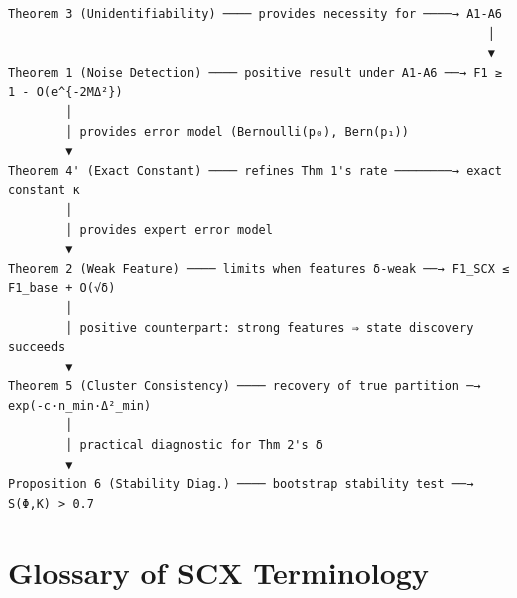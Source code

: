 \documentclass{article}
\begin{document}
\begin{verbatim}
Theorem 3 (Unidentifiability) ──── provides necessity for ────→ A1-A6
                                                                   │
                                                                   ▼
Theorem 1 (Noise Detection) ──── positive result under A1-A6 ──→ F1 ≥ 1 - O(e^{-2MΔ²})
        │
        │ provides error model (Bernoulli(p₀), Bern(p₁))
        ▼
Theorem 4' (Exact Constant) ──── refines Thm 1's rate ────────→ exact constant κ
        │
        │ provides expert error model
        ▼
Theorem 2 (Weak Feature) ──── limits when features δ-weak ──→ F1_SCX ≤ F1_base + O(√δ)
        │
        │ positive counterpart: strong features ⇒ state discovery succeeds
        ▼
Theorem 5 (Cluster Consistency) ──── recovery of true partition ─→ exp(-c·n_min·Δ²_min)
        │
        │ practical diagnostic for Thm 2's δ
        ▼
Proposition 6 (Stability Diag.) ──── bootstrap stability test ──→ S(Φ,K) > 0.7
\end{verbatim}

\section{Glossary of SCX Terminology}
\label{sec:glossary}
\end{document}
